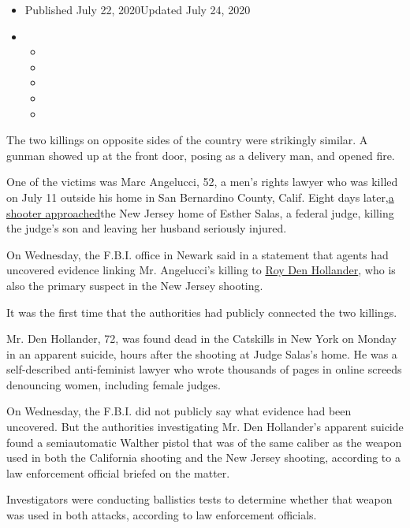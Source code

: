 \begin{itemize}
\item
  Published July 22, 2020Updated July 24, 2020
\item
  \begin{itemize}
  \item
  \item
  \item
  \item
  \item
  \end{itemize}
\end{itemize}

The two killings on opposite sides of the country were strikingly
similar. A gunman showed up at the front door, posing as a delivery man,
and opened fire.

One of the victims was Marc Angelucci, 52, a men's rights lawyer who was
killed on July 11 outside his home in San Bernardino County, Calif.
Eight days
later,\href{https://www.nytimes.com/2020/07/20/nyregion/esther-salas.html}{a
shooter approached}the New Jersey home of Esther Salas, a federal judge,
killing the judge's son and leaving her husband seriously injured.

On Wednesday, the F.B.I. office in Newark said in a statement that
agents had uncovered evidence linking Mr. Angelucci's killing to
\href{https://www.nytimes.com/2020/07/25/nyregion/roy-den-hollander-esther-salas-list.html}{Roy
Den Hollander}, who is also the primary suspect in the New Jersey
shooting.

It was the first time that the authorities had publicly connected the
two killings.

Mr. Den Hollander, 72, was found dead in the Catskills in New York on
Monday in an apparent suicide, hours after the shooting at Judge Salas's
home. He was a self-described anti-feminist lawyer who wrote thousands
of pages in online screeds denouncing women, including female judges.

On Wednesday, the F.B.I. did not publicly say what evidence had been
uncovered. But the authorities investigating Mr. Den Hollander's
apparent suicide found a semiautomatic Walther pistol that was of the
same caliber as the weapon used in both the California shooting and the
New Jersey shooting, according to a law enforcement official briefed on
the matter.

Investigators were conducting ballistics tests to determine whether that
weapon was used in both attacks, according to law enforcement officials.

